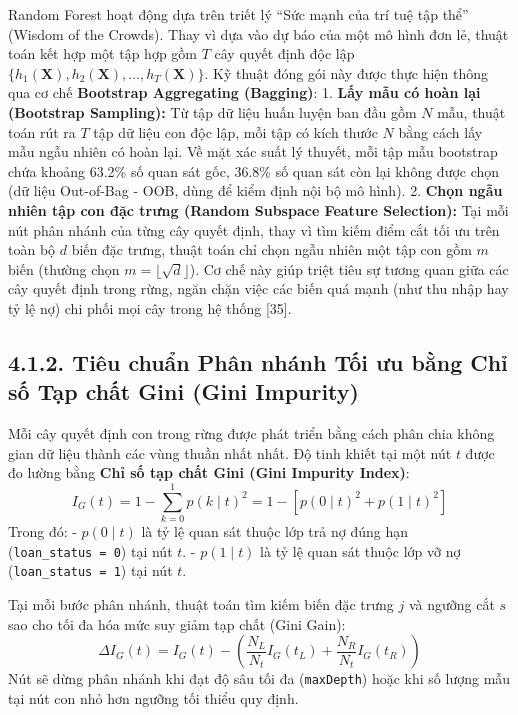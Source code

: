 \documentclass[
  13pt,
  a4paper,
]{report}
\begin{document}
Random Forest hoạt động dựa trên triết lý ``Sức mạnh của trí tuệ tập
thể'' (Wisdom of the Crowds). Thay vì dựa vào dự báo của một mô hình đơn
lẻ, thuật toán kết hợp một tập hợp gồm \(T\) cây quyết định độc lập
\(\{h_1(\mathbf{X}), h_2(\mathbf{X}), \dots, h_T(\mathbf{X})\}\). Kỹ
thuật đóng gói này được thực hiện thông qua cơ chế \textbf{Bootstrap
Aggregating (Bagging)}: 1. \textbf{Lấy mẫu có hoàn lại (Bootstrap
Sampling):} Từ tập dữ liệu huấn luyện ban đầu gồm \(N\) mẫu, thuật toán
rút ra \(T\) tập dữ liệu con độc lập, mỗi tập có kích thước \(N\) bằng
cách lấy mẫu ngẫu nhiên có hoàn lại. Về mặt xác suất lý thuyết, mỗi tập
mẫu bootstrap chứa khoảng 63.2\% số quan sát gốc, 36.8\% số quan sát còn
lại không được chọn (dữ liệu Out-of-Bag - OOB, dùng để kiểm định nội bộ
mô hình). 2. \textbf{Chọn ngẫu nhiên tập con đặc trưng (Random Subspace
Feature Selection):} Tại mỗi nút phân nhánh của từng cây quyết định,
thay vì tìm kiếm điểm cắt tối ưu trên toàn bộ \(d\) biến đặc trưng,
thuật toán chỉ chọn ngẫu nhiên một tập con gồm \(m\) biến (thường chọn
\(m = \lfloor \sqrt{d} \rfloor\)). Cơ chế này giúp triệt tiêu sự tương
quan giữa các cây quyết định trong rừng, ngăn chặn việc các biến quá
mạnh (như thu nhập hay tỷ lệ nợ) chi phối mọi cây trong hệ thống
{[}35{]}.

\subsection{4.1.2. Tiêu chuẩn Phân nhánh Tối ưu bằng Chỉ số Tạp chất
Gini (Gini
Impurity)}\label{tiuxeau-chuux1ea9n-phuxe2n-nhuxe1nh-tux1ed1i-ux1b0u-bux1eb1ng-chux1ec9-sux1ed1-tux1ea1p-chux1ea5t-gini-gini-impurity}

Mỗi cây quyết định con trong rừng được phát triển bằng cách phân chia
không gian dữ liệu thành các vùng thuần nhất nhất. Độ tinh khiết tại một
nút \(t\) được đo lường bằng \textbf{Chỉ số tạp chất Gini (Gini Impurity
Index)}:
\[I_G(t) = 1 - \sum_{k=0}^{1} p(k \mid t)^2 = 1 - [p(0 \mid t)^2 + p(1 \mid t)^2]\]
Trong đó: - \(p(0 \mid t)\) là tỷ lệ quan sát thuộc lớp trả nợ đúng hạn
(\texttt{loan\_status\ =\ 0}) tại nút \(t\). - \(p(1 \mid t)\) là tỷ lệ
quan sát thuộc lớp vỡ nợ (\texttt{loan\_status\ =\ 1}) tại nút \(t\).

Tại mỗi bước phân nhánh, thuật toán tìm kiếm biến đặc trưng \(j\) và
ngưỡng cắt \(s\) sao cho tối đa hóa mức suy giảm tạp chất (Gini Gain):
\[\Delta I_G(t) = I_G(t) - \left( \frac{N_L}{N_t} I_G(t_L) + \frac{N_R}{N_t} I_G(t_R) \right)\]
Nút sẽ dừng phân nhánh khi đạt độ sâu tối đa (\texttt{maxDepth}) hoặc
khi số lượng mẫu tại nút con nhỏ hơn ngưỡng tối thiểu quy định.
\end{document}

